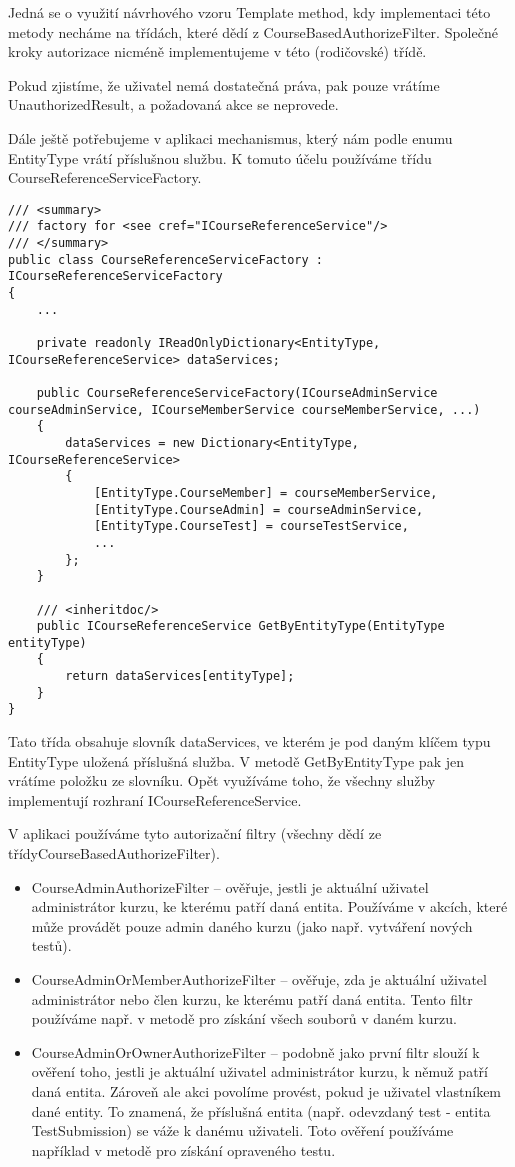 Jedná se o využití návrhového vzoru Template method, kdy implementaci této metody necháme na třídách, které dědí z CourseBasedAuthorizeFilter. 
Společné kroky autorizace nicméně implementujeme v této (rodičovské) třídě.

Pokud zjistíme, že uživatel nemá dostatečná práva, pak pouze vrátíme UnauthorizedResult, a požadovaná akce se neprovede.

Dále ještě potřebujeme v aplikaci mechanismus, který nám podle enumu EntityType vrátí příslušnou službu. K tomuto účelu používáme třídu CourseReferenceServiceFactory.
\begin{lstlisting}
/// <summary>
/// factory for <see cref="ICourseReferenceService"/>
/// </summary>
public class CourseReferenceServiceFactory : ICourseReferenceServiceFactory
{
	...
	
	private readonly IReadOnlyDictionary<EntityType, ICourseReferenceService> dataServices;
	
	public CourseReferenceServiceFactory(ICourseAdminService courseAdminService, ICourseMemberService courseMemberService, ...)
	{
		dataServices = new Dictionary<EntityType, ICourseReferenceService>
		{
			[EntityType.CourseMember] = courseMemberService,
			[EntityType.CourseAdmin] = courseAdminService,
			[EntityType.CourseTest] = courseTestService,
			...
		};
	}
	
	/// <inheritdoc/>
	public ICourseReferenceService GetByEntityType(EntityType entityType)
	{
		return dataServices[entityType];
	}
}
\end{lstlisting}

Tato třída obsahuje slovník dataServices, ve kterém je pod daným klíčem typu EntityType uložená příslušná služba.
V metodě GetByEntityType pak jen vrátíme položku ze slovníku.
Opět využíváme toho, že všechny služby implementují rozhraní ICourseReferenceService.

V aplikaci používáme tyto autorizační filtry (všechny dědí ze třídyCourseBasedAuthorizeFilter).
\begin{itemize}
	\item CourseAdminAuthorizeFilter -- ověřuje, jestli je aktuální uživatel administrátor kurzu, ke kterému patří daná entita. Používáme v akcích, které může provádět pouze admin daného kurzu (jako např. vytváření nových testů).
	\item CourseAdminOrMemberAuthorizeFilter -- ověřuje, zda je aktuální uživatel administrátor nebo člen kurzu, ke kterému patří daná entita. Tento filtr používáme např. v metodě pro získání všech souborů v daném kurzu.
	\item CourseAdminOrOwnerAuthorizeFilter -- podobně jako první filtr slouží k ověření toho, jestli je aktuální uživatel administrátor kurzu, k němuž patří daná entita. Zároveň ale akci povolíme provést, pokud je uživatel vlastníkem dané entity. To znamená, že příslušná entita (např. odevzdaný test - entita TestSubmission) se váže k danému uživateli. Toto ověření používáme například v metodě pro získání opraveného testu.
\end{itemize}

